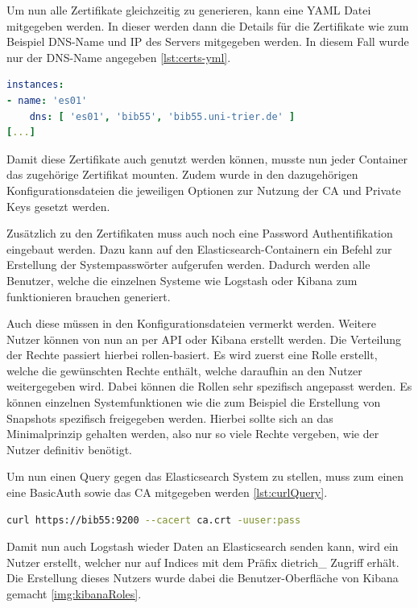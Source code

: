 Um nun alle Zertifikate gleichzeitig zu generieren, kann eine YAML Datei mitgegeben werden. In dieser werden dann die Details für die Zertifikate wie zum Beispiel DNS-Name und IP des Servers mitgegeben werden. In diesem Fall wurde nur der DNS-Name angegeben \ref{lst:certs-yml}.

\begin{lstlisting}[language=YAML, frame=single, label={lst:certs-yml}] 
instances:
- name: 'es01'
	dns: [ 'es01', 'bib55', 'bib55.uni-trier.de' ]
[...]
\end{lstlisting}

Damit diese Zertifikate auch genutzt werden können, musste nun jeder Container das zugehörige Zertifikat mounten. Zudem wurde in den dazugehörigen Konfigurationsdateien die jeweiligen Optionen zur Nutzung der CA und Private Keys gesetzt werden.

Zusätzlich zu den Zertifikaten muss auch noch eine Password Authentifikation eingebaut werden. Dazu kann auf den Elasticsearch-Containern ein Befehl zur Erstellung der Systempasswörter aufgerufen werden. Dadurch werden alle Benutzer, welche die einzelnen Systeme wie Logstash oder Kibana zum funktionieren brauchen generiert.

Auch diese müssen in den Konfigurationsdateien vermerkt werden. Weitere Nutzer können von nun an per API oder Kibana erstellt werden. Die Verteilung der Rechte passiert hierbei rollen-basiert. Es wird zuerst eine Rolle erstellt, welche die gewünschten Rechte enthält, welche daraufhin an den Nutzer weitergegeben wird. Dabei können die Rollen sehr spezifisch angepasst werden. Es können einzelnen Systemfunktionen wie die zum Beispiel die Erstellung von Snapshots spezifisch freigegeben werden. Hierbei sollte sich an das Minimalprinzip gehalten werden, also nur so viele Rechte vergeben, wie der Nutzer definitiv benötigt.

Um nun einen Query gegen das Elasticsearch System zu stellen, muss zum einen eine BasicAuth sowie das CA mitgegeben werden \ref{lst:curlQuery}.

\begin{lstlisting}[language=BASH, frame=single, label={lst:curlQuery}] 
curl https://bib55:9200 --cacert ca.crt -uuser:pass
\end{lstlisting}

Damit nun auch Logstash wieder Daten an Elasticsearch senden kann, wird ein Nutzer erstellt, welcher nur auf Indices mit dem Präfix dietrich\_ Zugriff erhält. Die Erstellung dieses Nutzers wurde dabei die Benutzer-Oberfläche von Kibana gemacht \ref{img:kibanaRoles}. 

